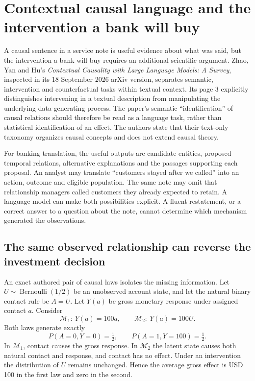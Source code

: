 \section{Contextual causal language and the intervention a bank will buy}
\label{exec23:context-scope}

A causal sentence in a service note is useful evidence about what was said,
but the intervention a bank will buy requires an additional scientific
argument. Zhao, Yan and Hu's \emph{Contextual Causality with Large Language
Models: A Survey}, inspected in its 18 September 2026 arXiv version, separates
semantic, intervention and counterfactual tasks within textual context. Its
page 3 explicitly distinguishes intervening in a textual description from
manipulating the underlying data-generating process. The paper's semantic
``identification'' of causal relations should therefore be read as a language
task, rather than statistical identification of an effect. The authors state
that their text-only taxonomy organizes causal concepts and does not extend
causal theory.~\citep{exec23_contextual_causality_survey}

For banking translation, the useful outputs are candidate entities, proposed
temporal relations, alternative explanations and the passages supporting each
proposal. An analyst may translate ``customers stayed after we called'' into
an action, outcome and eligible population. The same note may omit that
relationship managers called customers they already expected to retain. A
language model can make both possibilities explicit. A fluent restatement,
or a correct answer to a question about the note, cannot determine which
mechanism generated the observations.

\subsection{The same observed relationship can reverse the investment decision}
\label{exec23:context-twins}

An exact authored pair of causal laws isolates the missing information. Let
$U\sim\operatorname{Bernoulli}(1/2)$ be an unobserved account state, and let the
natural binary contact rule be $A=U$. Let $Y(a)$ be gross monetary response
under assigned contact $a$. Consider
\begin{equation}
 \mathcal M_1:\ Y(a)=100a,
 \qquad
 \mathcal M_2:\ Y(a)=100U.
 \label{exec23:context-laws}
\end{equation}
Both laws generate exactly
\begin{equation}
 P(A=0,Y=0)=\tfrac12,
 \qquad P(A=1,Y=100)=\tfrac12.
 \label{exec23:context-observed}
\end{equation}
In $\mathcal M_1$, contact causes the gross response. In $\mathcal M_2$ the
latent state causes both natural contact and response, and contact has no
effect. Under an intervention the distribution of $U$ remains unchanged.
Hence the average gross effect is USD 100 in the first law and zero in the
second.~\citep{exec23_context_reference}

